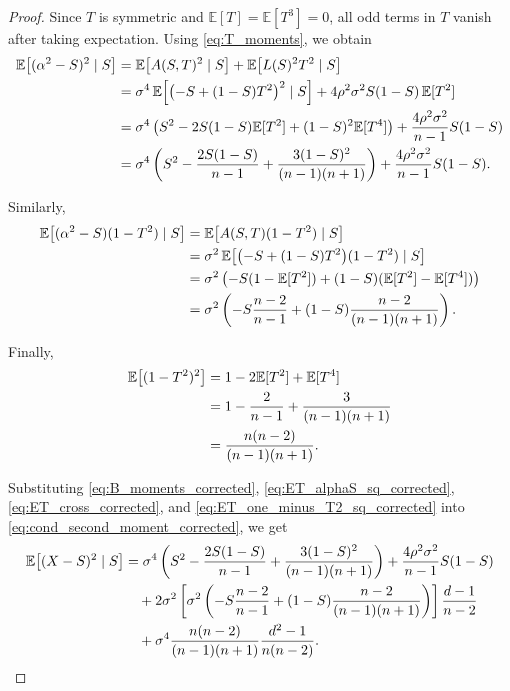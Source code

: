 \documentclass[10pt,a4paper]{amsart}
\begin{document}
\begin{proof}
Since $T$ is symmetric and $\mathbb E[T]=\mathbb E[T^3]=0$, all odd terms in $T$ vanish after taking expectation.
Using \eqref{eq:T_moments}, we obtain
\begin{align}
\mathbb E\big[(\alpha^2-S)^2\mid S\big]
&=
\mathbb E\big[A(S,T)^2\mid S\big]
+
\mathbb E\big[L(S)^2T^2\mid S\big]
\notag\\
&=
\sigma^4\,
\mathbb E\!\left[\bigl(-S+(1-S)T^2\bigr)^2\mid S\right]
+
4\rho^2\sigma^2 S(1-S)\,\mathbb E[T^2]
\notag\\
&=
\sigma^4\left(
S^2
-2S(1-S)\mathbb E[T^2]
+(1-S)^2\mathbb E[T^4]
\right)
+
\frac{4\rho^2\sigma^2}{n-1}S(1-S)
\notag\\
&=
\sigma^4\left(
S^2
-\frac{2S(1-S)}{n-1}
+\frac{3(1-S)^2}{(n-1)(n+1)}
\right)
+
\frac{4\rho^2\sigma^2}{n-1}S(1-S).
\label{eq:ET_alphaS_sq_corrected}
\end{align}

Similarly,
\begin{align}
\mathbb E\big[(\alpha^2-S)(1-T^2)\mid S\big]
&=
\mathbb E\big[A(S,T)(1-T^2)\mid S\big]
\notag\\
&=
\sigma^2\,\mathbb E\!\left[\bigl(-S+(1-S)T^2\bigr)(1-T^2)\mid S\right]
\notag\\
&=
\sigma^2\left(
-S(1-\mathbb E[T^2])+(1-S)(\mathbb E[T^2]-\mathbb E[T^4])
\right)
\notag\\
&=
\sigma^2\left(
-S\frac{n-2}{n-1}
+
(1-S)\frac{n-2}{(n-1)(n+1)}
\right).
\label{eq:ET_cross_corrected}
\end{align}

Finally,
\begin{align}
\mathbb E\big[(1-T^2)^2\big]
&=
1-2\mathbb E[T^2]+\mathbb E[T^4]
\notag\\
&=
1-\frac{2}{n-1}+\frac{3}{(n-1)(n+1)}
\notag\\
&=
\frac{n(n-2)}{(n-1)(n+1)}.
\label{eq:ET_one_minus_T2_sq_corrected}
\end{align}

Substituting \eqref{eq:B_moments_corrected}, \eqref{eq:ET_alphaS_sq_corrected}, \eqref{eq:ET_cross_corrected}, and \eqref{eq:ET_one_minus_T2_sq_corrected} into \eqref{eq:cond_second_moment_corrected}, we get
\begin{align}
\mathbb E\big[(X-S)^2\mid S\big]
&=
\sigma^4\left(
S^2
-\frac{2S(1-S)}{n-1}
+\frac{3(1-S)^2}{(n-1)(n+1)}
\right)
+
\frac{4\rho^2\sigma^2}{n-1}S(1-S)
\notag\\
&\quad
+
2\sigma^2
\left[
\sigma^2\left(
-S\frac{n-2}{n-1}
+
(1-S)\frac{n-2}{(n-1)(n+1)}
\right)
\right]
\frac{d-1}{n-2}
\notag\\
&\quad
+
\sigma^4\frac{n(n-2)}{(n-1)(n+1)}\frac{d^2-1}{n(n-2)}.
\label{eq:after_substitution_corrected}
\end{align}


\end{proof}
\end{document}
